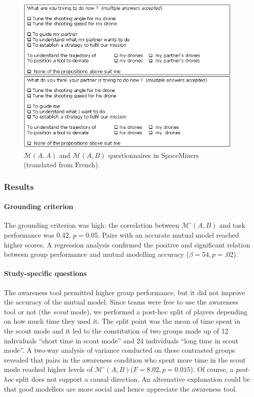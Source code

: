 \documentclass[twocolumn]{article}
\newcommand{\gmodel}[2]{{$\mathcal{M}(#1, #2)$}}
\newcommand{\gModel}[2]{{$\mathcal{M}^{\circ}(#1, #2)$}}
\begin{document}
\begin{figure}[ht!]
        \centering
        \includegraphics[width=\columnwidth]{image5.png}
        \caption{\gmodel{A}{A} and \gmodel{A}{B} questionnaires in SpaceMiners
        (translated from French).}

        \label{study1:questionnaires}
\end{figure}

\subsubsection*{Results}

\paragraph{Grounding criterion} The grounding criterion was high: the
correlation between \gModel{A}{B} and task performance was 0.42, $p = 0.05$.
Pairs with an accurate mutual model reached higher scores. A regression analysis
confirmed the positive and significant relation between group performance and
mutual modelling accuracy ($\beta=54, p = .02$).

\paragraph{Study-specific questions} The awareness tool permitted higher group
performance, but it did not improve the accuracy of the mutual model. Since
teams were free to use the awareness tool or not (the \emph{scout} mode), we
performed a post-hoc split of players depending on how much time they used it.
The split point was the mean of time spent in the scout mode and it led to the
constitution of two groups made up of 12 individuals ``short time in scout
mode'' and 24 individuals ``long time in scout mode''. A two-way analysis of
variance conducted on these contrasted groups revealed that pairs in the
awareness condition who spent more time in the scout mode reached higher levels
of \gModel{A}{B}($F = 8.02, p = 0.015$). Of course, a \textit{post-hoc} split
does not support a causal direction. An alternative explanation could be that
good modellers are more social and hence appreciate the awareness tool.
\end{document}
